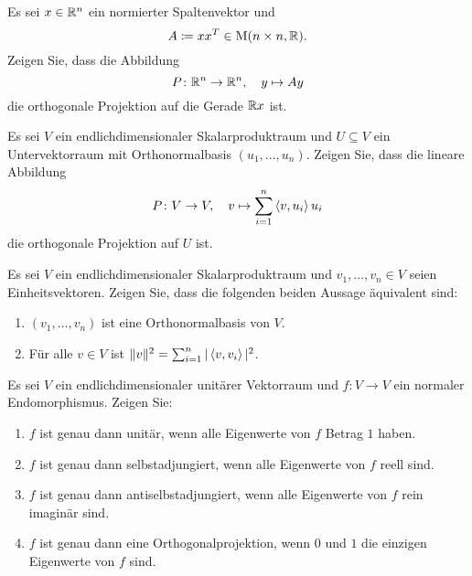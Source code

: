 \begin{question}[subtitle = Orthogonalprojektion auf eine Gerade]{2}
  Es sei $x \in \mathbb{R}^n$ ein normierter Spaltenvektor und
  \[
    A \coloneqq x x^T \in \operatorname{M}(n \times n, \mathbb{R}).
  \]
  Zeigen Sie, dass die Abbildung
  \[
    P \colon \mathbb{R}^n \to \mathbb{R}^n,
    \quad
    y \mapsto Ay
  \]
  die orthogonale Projektion auf die Gerade $\mathbb{R} x$ ist.
\end{question}


\begin{question}[subtitle = Eine Formel für die Orthogonalprojektion]{2}
  Es sei $V$ ein endlichdimensionaler Skalarproduktraum und $U \subseteq V$ ein Untervektorraum mit Orthonormalbasis $(u_1, \dotsc, u_n)$.
  Zeigen Sie, dass die lineare Abbildung
  \[
    P \colon V \to V,
    \quad
    v \mapsto \sum_{i=1}^n \left\langle v, u_i \right\rangle u_i
  \]
  die orthogonale Projektion auf $U$ ist.
\end{question}


\begin{question}[subtitle = Eine Bedingung für Orthonormalbasen]{2}
  Es sei $V$ ein endlichdimensionaler Skalarproduktraum und $v_1, \dotsc, v_n \in V$ seien Einheitsvektoren.
  Zeigen Sie, dass die folgenden beiden Aussage äquivalent sind:
  \begin{enumerate}
    \item
      $(v_1, \dotsc, v_n)$ ist eine Orthonormalbasis von $V$.
    \item
      Für alle $v \in V$ ist $\| v \|^2 = \sum_{i=1}^n |\left\langle v, v_i \right\rangle|^2$.
  \end{enumerate}
\end{question}


\begin{question}[subtitle = Normale Endomorphismen und ihre Eigenwerte]{2}
  Es sei $V$ ein endlichdimensionaler unitärer Vektorraum und $f \colon V \to V$ ein normaler Endomorphismus.
  Zeigen Sie:
  \begin{enumerate}[leftmargin=*]
    \item
      $f$ ist genau dann unitär, wenn alle Eigenwerte von $f$ Betrag $1$ haben.
    \item
      $f$ ist genau dann selbstadjungiert, wenn alle Eigenwerte von $f$ reell sind.
    \item
      $f$ ist genau dann antiselbstadjungiert, wenn alle Eigenwerte von $f$ rein imaginär sind.
    \item
      $f$ ist genau dann eine Orthogonalprojektion, wenn $0$ und $1$ die einzigen Eigenwerte von $f$ sind.
  \end{enumerate}
\end{question}


